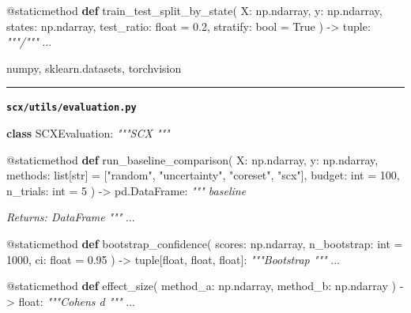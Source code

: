 \documentclass[
  12pt,
]{article}
\newenvironment{Shaded}{}{}
\newcommand{\AttributeTok}[1]{\textcolor[rgb]{0.49,0.56,0.16}{#1}}
\newcommand{\BuiltInTok}[1]{\textcolor[rgb]{0.00,0.50,0.00}{#1}}
\newcommand{\CommentTok}[1]{\textcolor[rgb]{0.38,0.63,0.69}{\textit{#1}}}
\newcommand{\DecValTok}[1]{\textcolor[rgb]{0.25,0.63,0.44}{#1}}
\newcommand{\FloatTok}[1]{\textcolor[rgb]{0.25,0.63,0.44}{#1}}
\newcommand{\KeywordTok}[1]{\textcolor[rgb]{0.00,0.44,0.13}{\textbf{#1}}}
\newcommand{\NormalTok}[1]{#1}
\newcommand{\OperatorTok}[1]{\textcolor[rgb]{0.40,0.40,0.40}{#1}}
\newcommand{\StringTok}[1]{\textcolor[rgb]{0.25,0.44,0.63}{#1}}
\newcommand{\VariableTok}[1]{\textcolor[rgb]{0.10,0.09,0.49}{#1}}
\begin{document}
\begin{Shaded}
\begin{Highlighting}[]
    \AttributeTok{@staticmethod}
    \KeywordTok{def}\NormalTok{ train\_test\_split\_by\_state(}
\NormalTok{        X: np.ndarray, y: np.ndarray,}
\NormalTok{        states: np.ndarray,}
\NormalTok{        test\_ratio: }\BuiltInTok{float} \OperatorTok{=} \FloatTok{0.2}\NormalTok{,}
\NormalTok{        stratify: }\BuiltInTok{bool} \OperatorTok{=} \VariableTok{True}
\NormalTok{    ) }\OperatorTok{{-}\textgreater{}} \BuiltInTok{tuple}\NormalTok{:}
        \CommentTok{"""/"""}
\NormalTok{        ...}
\end{Highlighting}
\end{Shaded}

numpy, sklearn.datasets, torchvision

\begin{center}\rule{0.5\linewidth}{0.5pt}\end{center}

\textbf{\texttt{scx/utils/evaluation.py}}

\begin{Shaded}
\begin{Highlighting}[]
\KeywordTok{class}\NormalTok{ SCXEvaluation:}
    \CommentTok{"""SCX """}

    \AttributeTok{@staticmethod}
    \KeywordTok{def}\NormalTok{ run\_baseline\_comparison(}
\NormalTok{        X: np.ndarray, y: np.ndarray,}
\NormalTok{        methods: }\BuiltInTok{list}\NormalTok{[}\BuiltInTok{str}\NormalTok{] }\OperatorTok{=}\NormalTok{ [}\StringTok{"random"}\NormalTok{, }\StringTok{"uncertainty"}\NormalTok{, }\StringTok{"coreset"}\NormalTok{, }\StringTok{"scx"}\NormalTok{],}
\NormalTok{        budget: }\BuiltInTok{int} \OperatorTok{=} \DecValTok{100}\NormalTok{,}
\NormalTok{        n\_trials: }\BuiltInTok{int} \OperatorTok{=} \DecValTok{5}
\NormalTok{    ) }\OperatorTok{{-}\textgreater{}}\NormalTok{ pd.DataFrame:}
        \CommentTok{""" baseline }

\CommentTok{        Returns: DataFrame }
\CommentTok{        """}
\NormalTok{        ...}

    \AttributeTok{@staticmethod}
    \KeywordTok{def}\NormalTok{ bootstrap\_confidence(}
\NormalTok{        scores: np.ndarray,}
\NormalTok{        n\_bootstrap: }\BuiltInTok{int} \OperatorTok{=} \DecValTok{1000}\NormalTok{,}
\NormalTok{        ci: }\BuiltInTok{float} \OperatorTok{=} \FloatTok{0.95}
\NormalTok{    ) }\OperatorTok{{-}\textgreater{}} \BuiltInTok{tuple}\NormalTok{[}\BuiltInTok{float}\NormalTok{, }\BuiltInTok{float}\NormalTok{, }\BuiltInTok{float}\NormalTok{]:}
        \CommentTok{"""Bootstrap """}
\NormalTok{        ...}

    \AttributeTok{@staticmethod}
    \KeywordTok{def}\NormalTok{ effect\_size(}
\NormalTok{        method\_a: np.ndarray,}
\NormalTok{        method\_b: np.ndarray}
\NormalTok{    ) }\OperatorTok{{-}\textgreater{}} \BuiltInTok{float}\NormalTok{:}
        \CommentTok{"""Cohen\textquotesingle{}s d """}
\NormalTok{        ...}
\end{Highlighting}
\end{Shaded}
\end{document}
